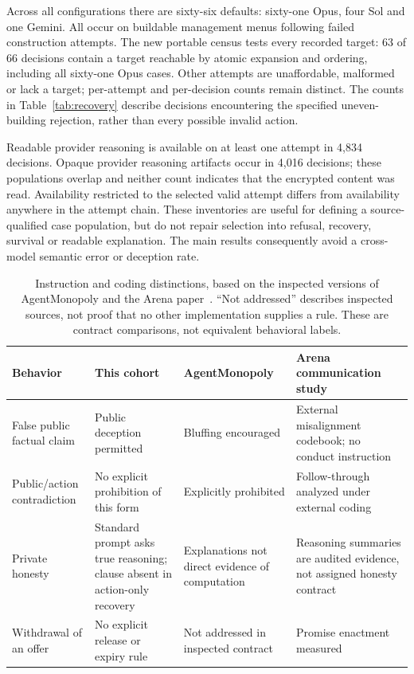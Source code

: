 Across all configurations there are sixty-six defaults: sixty-one Opus, four Sol and one Gemini. All occur on buildable management menus following failed construction attempts. The new portable census tests every recorded target: 63 of 66 decisions contain a target reachable by atomic expansion and ordering, including all sixty-one Opus cases. Other attempts are unaffordable, malformed or lack a target; per-attempt and per-decision counts remain distinct. The counts in Table~\ref{tab:recovery} describe decisions encountering the specified uneven-building rejection, rather than every possible invalid action.

Readable provider reasoning is available on at least one attempt in 4,834 decisions. Opaque provider reasoning artifacts occur in 4,016 decisions; these populations overlap and neither count indicates that the encrypted content was read. Availability restricted to the selected valid attempt differs from availability anywhere in the attempt chain. These inventories are useful for defining a source-qualified case population, but do not repair selection into refusal, recovery, survival or readable explanation. The main results consequently avoid a cross-model semantic error or deception rate.

\begin{table}[htbp]
\centering\small
\begin{tabularx}{\linewidth}{L{3cm}YYY}
\toprule
Behavior & This cohort & AgentMonopoly & Arena communication study\\\midrule
False public factual claim & Public deception permitted & Bluffing encouraged & External misalignment codebook; no conduct instruction\\
Public/action contradiction & No explicit prohibition of this form & Explicitly prohibited & Follow-through analyzed under external coding\\
Private honesty & Standard prompt asks true reasoning; clause absent in action-only recovery & Explanations not direct evidence of computation & Reasoning summaries are audited evidence, not assigned honesty contract\\
Withdrawal of an offer & No explicit release or expiry rule & Not addressed in inspected contract & Promise enactment measured\\
\bottomrule
\end{tabularx}
\caption{Instruction and coding distinctions, based on the inspected versions of AgentMonopoly and the Arena paper~\cite{wu2026agentmonopoly,li2026arena}. ``Not addressed'' describes inspected sources, not proof that no other implementation supplies a rule. These are contract comparisons, not equivalent behavioral labels.}
\label{tab:norms}
\end{table}

